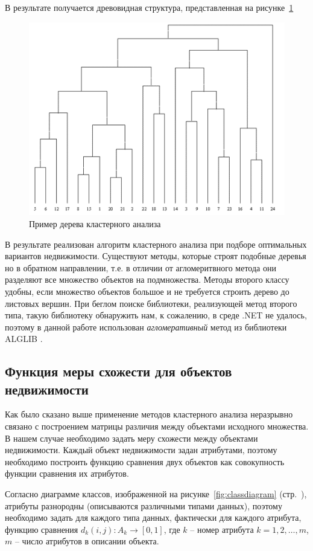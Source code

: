 \documentclass[a4paper,14pt,openany,final]{extreport} %
\def\oldcaption{} \let\oldcaption=\caption
\def\caption{\stepcounter{captionsnum}\oldcaption}
\begin{document}
В результате получается древовидная структура, представленная на рисунке~\ref{fig:hclusttree}
\begin{figure}[htbp]
  \centering
  \includegraphics[width=0.5\linewidth]{hclustexample.png}
  \caption{Пример дерева кластерного анализа \protect\cite{aicourse}}
  \label{fig:hclusttree}
\end{figure}
В результате реализован алгоритм кластерного анализа при подборе оптимальных вариантов недвижимости. Существуют методы, которые строят подобные деревья но в обратном направлении, т.е. в отличии от агломеритвного метода они разделяют все множество объектов на подмножества.  Методы второго классу удобны, если множество объектов большое и не требуется строить дерево до листовых вершин. При беглом поиске библиотеки, реализующей метод второго типа, такую библиотеку обнаружить нам, к сожалению, в среде .NET не удалось, поэтому в данной работе использован \emph{агломеративный} метод из библиотеки \textsc{ALGLIB} \cite{alglib}.

\subsection{Функция меры схожести для объектов недвижимости}

Как было сказано выше применение методов кластерного анализа неразрывно связано с построением матрицы различия между объектами исходного множества. В нашем случае необходимо задать меру схожести между объектами недвижимости. Каждый объект недвижимости задан атрибутами, поэтому необходимо построить функцию сравнения двух объектов как совокупность функции сравнения их атрибутов.

Согласно диаграмме классов, изображенной на рисунке~\ref{fig:classdiagram} (стр.~\pageref{fig:classdiagram}), атрибуты разнородны (описываются различными типами данных), поэтому необходимо задать для каждого типа данных, фактически для каждого атрибута, функцию сравнения $d_k(i,j):A_k\to [0,1]$, где $k$ -- номер атрибута $k=1,2,\ldots,m$, $m$ -- число атрибутов в описании объекта.
\end{document}
